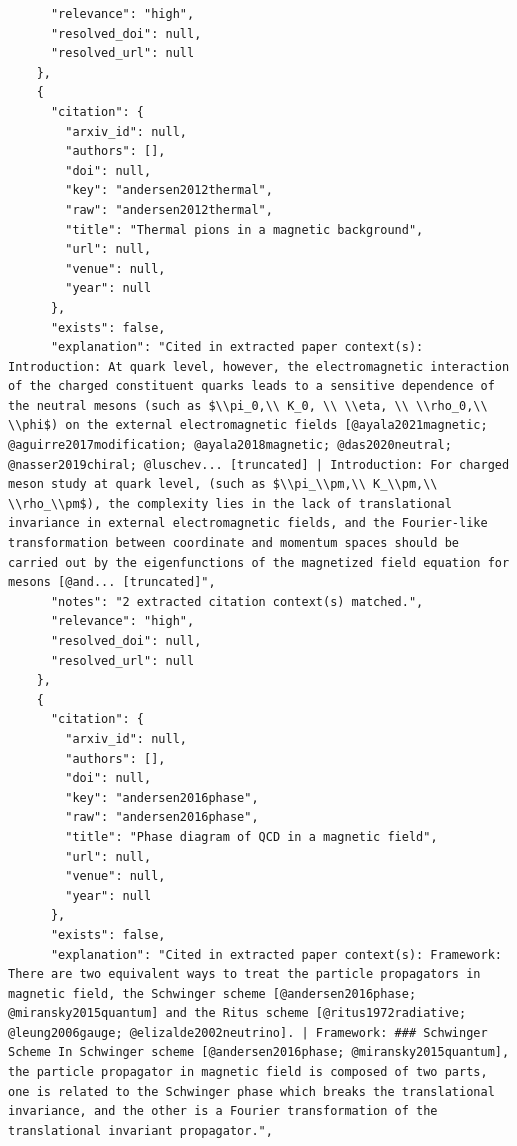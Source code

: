 \documentclass[11pt]{article}
\begin{document}
\begin{verbatim}
      "relevance": "high",
      "resolved_doi": null,
      "resolved_url": null
    },
    {
      "citation": {
        "arxiv_id": null,
        "authors": [],
        "doi": null,
        "key": "andersen2012thermal",
        "raw": "andersen2012thermal",
        "title": "Thermal pions in a magnetic background",
        "url": null,
        "venue": null,
        "year": null
      },
      "exists": false,
      "explanation": "Cited in extracted paper context(s): Introduction: At quark level, however, the electromagnetic interaction of the charged constituent quarks leads to a sensitive dependence of the neutral mesons (such as $\\pi_0,\\ K_0, \\ \\eta, \\ \\rho_0,\\ \\phi$) on the external electromagnetic fields [@ayala2021magnetic; @aguirre2017modification; @ayala2018magnetic; @das2020neutral; @nasser2019chiral; @luschev... [truncated] | Introduction: For charged meson study at quark level, (such as $\\pi_\\pm,\\ K_\\pm,\\ \\rho_\\pm$), the complexity lies in the lack of translational invariance in external electromagnetic fields, and the Fourier-like transformation between coordinate and momentum spaces should be carried out by the eigenfunctions of the magnetized field equation for mesons [@and... [truncated]",
      "notes": "2 extracted citation context(s) matched.",
      "relevance": "high",
      "resolved_doi": null,
      "resolved_url": null
    },
    {
      "citation": {
        "arxiv_id": null,
        "authors": [],
        "doi": null,
        "key": "andersen2016phase",
        "raw": "andersen2016phase",
        "title": "Phase diagram of QCD in a magnetic field",
        "url": null,
        "venue": null,
        "year": null
      },
      "exists": false,
      "explanation": "Cited in extracted paper context(s): Framework: There are two equivalent ways to treat the particle propagators in magnetic field, the Schwinger scheme [@andersen2016phase; @miransky2015quantum] and the Ritus scheme [@ritus1972radiative; @leung2006gauge; @elizalde2002neutrino]. | Framework: ### Schwinger Scheme In Schwinger scheme [@andersen2016phase; @miransky2015quantum], the particle propagator in magnetic field is composed of two parts, one is related to the Schwinger phase which breaks the translational invariance, and the other is a Fourier transformation of the translational invariant propagator.",

\end{verbatim}
\end{document}
